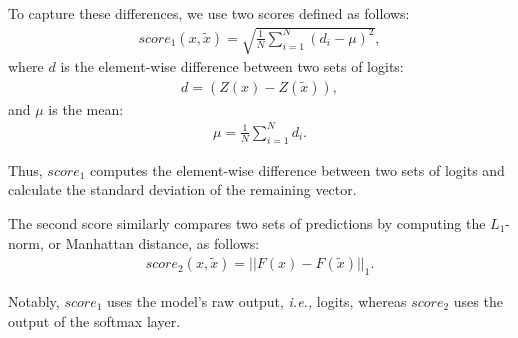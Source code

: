 To capture these differences, we use two scores defined as follows:
\begin{align}
    \label{eq:score1}
    score_{1}{(x,\tilde{x})}=\sqrt{\frac{1}{N}\sum_{i=1}^{N}(d_{i}-\mu)^{2}},
\end{align}
where $d$ is the element-wise difference between two sets of logits:
\begin{align}
    \label{eq:diff}
    d=(Z(x)-Z(\tilde{x})),
\end{align}
and $\mu$ is the mean:
\begin{align}
    \label{eq:mean_mu}
    \mu=\frac{1}{N}\sum_{i=1}^{N}d_{i}.
\end{align}

Thus, $score_{1}$ computes the element-wise difference between two sets of
logits and calculate the standard deviation of the remaining vector.

The second score similarly compares two sets of predictions by computing the
$L_1$-norm, or Manhattan distance, as follows:
\begin{align}
    \label{eq:score2}
    score_{2}{(x,\tilde{x})}=||F(x)-F(\tilde{x})||_{1}.
\end{align}

Notably, $score_{1}$ uses the model's raw output, \emph{i.e.,} logits, whereas
$score_{2}$ uses the output of the softmax layer.

